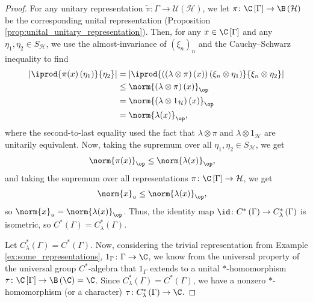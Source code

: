 \begin{proof}
  For any unitary representation $\widetilde{\pi}\colon \Gamma\rightarrow \mathcal{U}\left( \mathcal{H} \right)$, we let $\pi\colon \C\left[ \Gamma \right]\rightarrow \B\left( \mathcal{H} \right)$ be the corresponding unital representation (Proposition \ref{prop:unital_unitary_representation}). Then, for any $x\in \C\left[ \Gamma \right]$ and any $\eta_1,\eta_2\in S_{\mathcal{H}}$, we use the almost-invariance of $\left( \xi_n \right)_n$ and the Cauchy--Schwarz inequality to find
  \begin{align*}
    \left\vert \iprod{\pi(x)\left( \eta_1 \right)}{\eta_2} \right\vert &= \left\vert \iprod{\left( \left( \lambda\otimes \pi \right)\left( x \right) \right)\left( \xi_n\otimes \eta_1 \right)}{\xi_n\otimes \eta_2} \right\vert\\
                                                                       &\leq \norm{\left( \lambda\otimes \pi \right)(x)}_{\op}\\
                                                                       &= \norm{\left( \lambda\otimes 1_{\mathcal{H}} \right)\left( x \right)}_{\op}\\
                                                                       &= \norm{\lambda(x)}_{\op},
  \end{align*}
  where the second-to-last equality used the fact that $\lambda\otimes \pi$ and $\lambda\otimes 1_{\mathcal{H}}$ are unitarily equivalent. Now, taking the supremum over all $\eta_1,\eta_2\in S_{\mathcal{H}}$, we get
  \begin{align*}
    \norm{\pi(x)}_{\op} &\leq \norm{\lambda(x)}_{\op},
  \end{align*}
  and taking the supremum over all representations $\pi\colon \C\left[ \Gamma \right]\rightarrow \mathcal{H}$, we get
  \begin{align*}
    \norm{x}_{u} &\leq \norm{\lambda(x)}_{\op},
  \end{align*}
  so $\norm{x}_u = \norm{\lambda(x)}_{\op}$. Thus, the identity map $\id\colon C^{\ast}\left( \Gamma \right)\rightarrow C^{\ast}_{\lambda}\left( \Gamma \right)$ is isometric, so $C^{\ast}\left( \Gamma \right) = C^{\ast}_{\lambda}\left( \Gamma \right)$.\newline

  Let $C^{\ast}_{\lambda}\left( \Gamma \right) = C^{\ast}\left( \Gamma \right)$. Now, considering the trivial representation from Example \ref{ex:some_representations}, $1_{\Gamma}\colon \Gamma\rightarrow \C$, we know from the universal property of the universal group $C^{\ast}$-algebra that $1_{\Gamma}$ extends to a unital $\ast$-homomorphism $\tau\colon \C\left[ \Gamma \right]\rightarrow \B\left( \C \right) = \C$. Since $C^{\ast}_{\lambda}\left( \Gamma \right) = C^{\ast}\left( \Gamma \right)$, we have a nonzero $\ast$-homomorphism (or a character) $\tau\colon C^{\ast}_{\lambda}\left( \Gamma \right)\rightarrow \C$.\newline


\end{proof}
